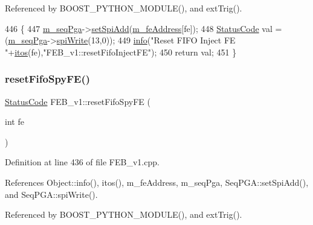 Referenced by B\+O\+O\+S\+T\+\_\+\+P\+Y\+T\+H\+O\+N\+\_\+\+M\+O\+D\+U\+L\+E(), and ext\+Trig().


\begin{DoxyCode}
446                                           \{  
447   \hyperlink{classFEB__v1_a6c7804ac86796f233a8393043adf2e77}{m\_seqPga}->\hyperlink{classSeqPGA_ac998ce3a6d9b5f2e88cc8393f8c1df53}{setSpiAdd}(\hyperlink{classFEB__v1_a4e1945c2d5b434125f375e9d0fc6d99f}{m\_feAddress}[fe]);
448   \hyperlink{classStatusCode}{StatusCode} val = (\hyperlink{classFEB__v1_a6c7804ac86796f233a8393043adf2e77}{m\_seqPga}->\hyperlink{classSeqPGA_ad4421841ce4ce8b88ad13f63216f0743}{spiWrite}(13,0));
449   \hyperlink{classObject_a644fd329ea4cb85f54fa6846484b84a8}{info}(\textcolor{stringliteral}{"Reset FIFO Inject FE "}+\hyperlink{Tools_8h_af330027dbdafb9a30768b3613c553e60}{itos}(fe),\textcolor{stringliteral}{"FEB\_v1::resetFifoInjectFE"});
450   \textcolor{keywordflow}{return} val;
451 \}
\end{DoxyCode}
\mbox{\label{classFEB__v1_ab02c292e29e01079bb9b268acbc782b1}} 
\subsubsection{\texorpdfstring{reset\+Fifo\+Spy\+F\+E()}{resetFifoSpyFE()}}
{\footnotesize\ttfamily \hyperlink{classStatusCode}{Status\+Code} F\+E\+B\+\_\+v1\+::reset\+Fifo\+Spy\+FE (\begin{DoxyParamCaption}\item[{int}]{fe }\end{DoxyParamCaption})}



Definition at line 436 of file F\+E\+B\+\_\+v1.\+cpp.



References Object\+::info(), itos(), m\+\_\+fe\+Address, m\+\_\+seq\+Pga, Seq\+P\+G\+A\+::set\+Spi\+Add(), and Seq\+P\+G\+A\+::spi\+Write().



Referenced by B\+O\+O\+S\+T\+\_\+\+P\+Y\+T\+H\+O\+N\+\_\+\+M\+O\+D\+U\+L\+E(), and ext\+Trig().


